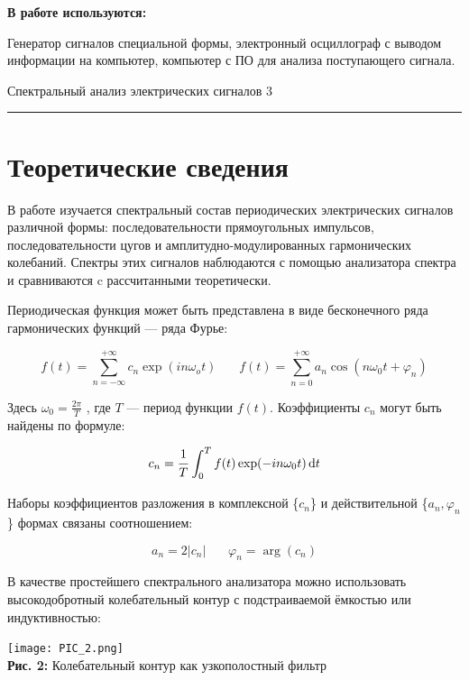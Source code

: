 \documentclass[12pt,a4paper]{scrartcl}
\begin{document}
	\textbf{В работе используются:}
	
	Генератор сигналов специальной формы, электронный осциллограф с выводом информации на компьютер, компьютер с ПО для анализа поступающего сигнала.
	
	\newpage
	
	
	\begin{flushleft}
		\footnotesize{Спектральный анализ электрических сигналов} \hspace{\fill} \footnotesize{3}
		\\[-0.3cm]\noindent\rule{\textwidth}{0.3pt}
	\end{flushleft}
	
	\section{Теоретические сведения}
	
	В работе изучается спектральный состав периодических электрических сигналов различной формы: последовательности прямоугольных импульсов, последовательности цугов и амплитудно-модулированных гармонических колебаний. Спектры этих сигналов наблюдаются с помощью анализатора спектра и сравниваются c рассчитанными теоретически.
	
	Периодическая функция может быть представлена в виде бесконечного ряда гармонических функций — ряда Фурье:
	
	$$f(t) = \sum_{n = -\infty}^{+\infty} c_n\exp(i n \omega_o t) \ \ \ \ \ \ \ \ f(t) = \sum_{n = 0}^{+\infty} a_n \cos (n \omega_0 t + \varphi_n)$$
	
	Здесь $\omega_0 = \frac{2\pi}{T}$ , где $T$ — период функции $f(t)$. Коэффициенты {$c_n$} могут быть найдены по формуле:
	
	$$c_n = \dfrac{\strut 1}{\strut T} \int_{0}^{T} f(t) \exp(-i n \omega_0 t)\, \mathrm{d} t$$
	
	Наборы коэффициентов разложения в комплексной \{$c_n$\} и действительной \{$a_n, \varphi_n$\} формах связаны соотношением:
	
	$$a_n = 2|c_n| \ \ \ \ \ \ \ \ \varphi_n = \arg (c_n)$$
	
	В качестве простейшего спектрального анализатора можно использовать высокодобротный	колебательный контур с подстраиваемой ёмкостью или индуктивностью:
	
	\begin{center}
		\texttt{[image: PIC\_2.png]}
		\\\textbf{Рис. 2:} Колебательный контур как узкополостный фильтр
	\end{center}
\end{document}
